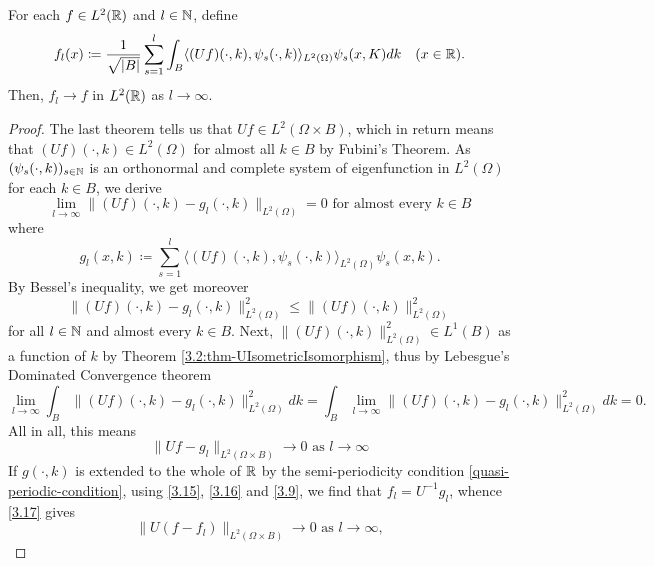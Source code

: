 \begin{theorem} \label{3.3:thm-flConvergence}
		For each $f \in L^{2}(\mathbb{R})$ and $l \in \mathbb{N}$, define
			\begin{equation}
				f_{l}(x) \coloneqq \frac{1}{\sqrt{|B|}} \sum_{s=1}^{l} \int_{B} \langle (Uf)(\cdot, k), \psi_{s}(\cdot, k) \rangle_{L^{2}(\Omega)} \psi_{s}(x, K) dk \quad (x \in \mathbb{R}). \label{3.15}
			\end{equation}
		Then, $f_{l} \rightarrow f$ in $L^{2}(\mathbb{R})$ as $l \rightarrow \infty$.

	\begin{proof}
		The last theorem tells us that $Uf \in L^{2}(\Omega \times B)$, which in return means that $(Uf)(\cdot, k) \in L^{2}(\Omega)$ for almost all $k \in B$ by Fubini's Theorem. As $(\psi_{s}(\cdot, k))_{s \in \mathbb{N}}$ is an orthonormal and complete system of eigenfunction in $L^{2}(\Omega)$ for each $k \in B$, we derive
			\[ \lim_{l \rightarrow \infty} \| (Uf)(\cdot, k) - g_{l}(\cdot, k) \|_{L^{2}(\Omega)} = 0 \text{ for almost every } k \in B \]
		where 
			\begin{equation}
				g_{l}(x, k) \coloneqq \sum_{s=1}^{l} \langle(Uf)(\cdot, k), \psi_{s}(\cdot,k)\rangle_{L^{2}(\Omega)} \psi_{s}(x,k). \label{3.16}
			\end{equation}
		By Bessel's inequality, we get moreover
			\[ \| (Uf)(\cdot, k) - g_{l}(\cdot, k) \|^{2}_{L^{2}(\Omega)} \leq \| (Uf)(\cdot, k) \|^{2}_{L^{2}(\Omega)}  \]
		for all $l \in \mathbb{N}$ and almost every $k \in B$. Next, $\|(Uf)(\cdot, k)\|^{2}_{L^{2}(\Omega)} \in L^{1}(B)$ as a function of $k$ by Theorem \ref{3.2:thm-UIsometricIsomorphism}, thus by Lebesgue's Dominated Convergence theorem
		\[ \lim_{l \rightarrow \infty} \int_{B} \| (Uf)(\cdot, k) - g_{l}(\cdot, k) \|^{2}_{L^{2}(\Omega)} dk  = \int_{B} \lim_{l \rightarrow \infty}  \| (Uf)(\cdot, k) - g_{l}(\cdot, k) \|^{2}_{L^{2}(\Omega)} dk = 0. \]
		  All in all, this means
			\begin{equation}
				\| U f - g_{l} \|_{L^{2}(\Omega \times B)} \rightarrow 0 \text{ as } l \rightarrow \infty \label{3.17}
			\end{equation} 
		 If $g(\cdot, k)$ is extended to the whole of $\mathbb{R}$ by the semi-periodicity condition \eqref{quasi-periodic-condition}, using \eqref{3.15}, \eqref{3.16} and \eqref{3.9}, we find that $f_{l} = U^{-1}g_{l}$, whence \eqref{3.17} gives
			\[ \| U(f - f_{l}) \|_{L^{2}(\Omega \times B)} \rightarrow 0 \text{ as } l \rightarrow \infty,\]
	\end{proof}
\end{theorem}